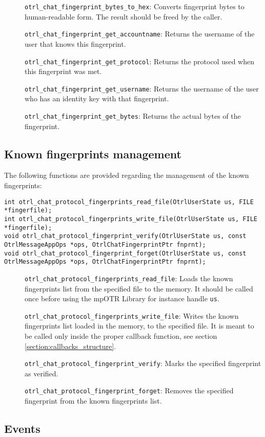 \begin{description}
  \item[] \texttt{otrl\_chat\_fingerprint\_bytes\_to\_hex}: Converts fingerprint bytes to human-readable form. The result should be freed by the caller.
  
  \item[] \texttt{otrl\_chat\_fingerprint\_get\_accountname}: Returns the username of the user that knows this fingerprint.
  
  \item[] \texttt{otrl\_chat\_fingerprint\_get\_protocol}: Returns the protocol used when this fingerprint was met.
  
  \item[] \texttt{otrl\_chat\_fingerprint\_get\_username}: Returns the username of the user who has an identity key with that fingerprint.
  
  \item[] \texttt{otrl\_chat\_fingerprint\_get\_bytes}: Returns the actual bytes of the fingerprint.

\end{description}

\subsection{Known fingerprints management}
\label{section:fingerprint_management}
The following functions are provided regarding the management of the known fingerprints:
\begin{lstlisting}
int otrl_chat_protocol_fingerprints_read_file(OtrlUserState us, FILE *fingerfile);
int otrl_chat_protocol_fingerprints_write_file(OtrlUserState us, FILE *fingerfile);
void otrl_chat_protocol_fingerprint_verify(OtrlUserState us, const OtrlMessageAppOps *ops, OtrlChatFingerprintPtr fnprnt);
void otrl_chat_protocol_fingerprint_forget(OtrlUserState us, const OtrlMessageAppOps *ops, OtrlChatFingerprintPtr fnprnt);
\end{lstlisting}

\begin{description}
  \item[] \texttt{otrl\_chat\_protocol\_fingerprints\_read\_file}: Loads the known fingerprints list from the specified file to the memory. It should be called once before using the mpOTR Library for instance handle \texttt{us}.
  
  \item[] \texttt{otrl\_chat\_protocol\_fingerprints\_write\_file}: Writes the known fingerprints list loaded in the memory, to the specified file. It is meant to be called only inside the proper callback function, see section \ref{section:callbacks_structure}.
  
  \item[] \texttt{otrl\_chat\_protocol\_fingerprint\_verify}: Marks the specified fingerprint as verified.
  
  \item[] \texttt{otrl\_chat\_protocol\_fingerprint\_forget}: Removes the specified fingerprint from the known fingerprints list.

\end{description}

\subsection{Events}
\label{section:events}
